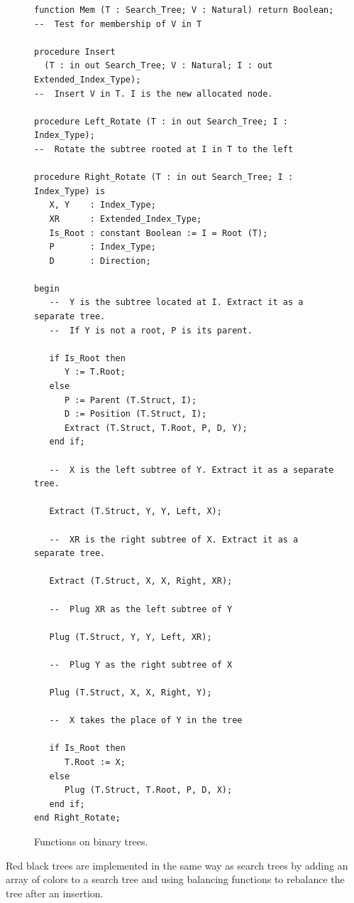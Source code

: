 \documentclass[11pt,a4paper]{article}
\begin{document}
\begin{figure}[ht]
\begin{small}
\begin{lstlisting}
function Mem (T : Search_Tree; V : Natural) return Boolean;
--  Test for membership of V in T

procedure Insert
  (T : in out Search_Tree; V : Natural; I : out Extended_Index_Type);
--  Insert V in T. I is the new allocated node.

procedure Left_Rotate (T : in out Search_Tree; I : Index_Type);
--  Rotate the subtree rooted at I in T to the left

procedure Right_Rotate (T : in out Search_Tree; I : Index_Type) is
   X, Y    : Index_Type;
   XR      : Extended_Index_Type;
   Is_Root : constant Boolean := I = Root (T);
   P       : Index_Type;
   D       : Direction;

begin
   --  Y is the subtree located at I. Extract it as a separate tree.
   --  If Y is not a root, P is its parent.

   if Is_Root then
      Y := T.Root;
   else
      P := Parent (T.Struct, I);
      D := Position (T.Struct, I);
      Extract (T.Struct, T.Root, P, D, Y);
   end if;

   --  X is the left subtree of Y. Extract it as a separate tree.

   Extract (T.Struct, Y, Y, Left, X);

   --  XR is the right subtree of X. Extract it as a separate tree.

   Extract (T.Struct, X, X, Right, XR);

   --  Plug XR as the left subtree of Y

   Plug (T.Struct, Y, Y, Left, XR);

   --  Plug Y as the right subtree of X

   Plug (T.Struct, X, X, Right, Y);

   --  X takes the place of Y in the tree

   if Is_Root then
      T.Root := X;
   else
      Plug (T.Struct, T.Root, P, D, X);
   end if;
end Right_Rotate;
\end{lstlisting}
\end{small}
\caption{\label{fig-search-fun} Functions on binary trees.}
\end{figure}

Red black trees are implemented in the same way as search trees by adding an array of
colors to a search tree and using balancing functions to rebalance the tree after an insertion.
\end{document}
